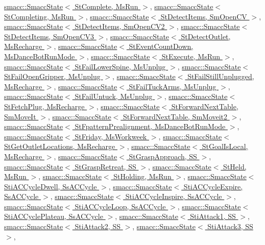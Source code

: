 \hyperlink{classsmacc_1_1SmaccState}{smacc\+::\+Smacc\+State$<$ St\+Complete, Ms\+Run $>$}, \hyperlink{classsmacc_1_1SmaccState}{smacc\+::\+Smacc\+State$<$ St\+Completing, Ms\+Run $>$}, \hyperlink{classsmacc_1_1SmaccState}{smacc\+::\+Smacc\+State$<$ St\+Detect\+Items, Sm\+Open\+C\+V $>$}, \hyperlink{classsmacc_1_1SmaccState}{smacc\+::\+Smacc\+State$<$ St\+Detect\+Items, Sm\+Open\+C\+V2 $>$}, \hyperlink{classsmacc_1_1SmaccState}{smacc\+::\+Smacc\+State$<$ St\+Detect\+Items, Sm\+Open\+C\+V3 $>$}, \hyperlink{classsmacc_1_1SmaccState}{smacc\+::\+Smacc\+State$<$ St\+Detect\+Outlet, Ms\+Recharge $>$}, \hyperlink{classsmacc_1_1SmaccState}{smacc\+::\+Smacc\+State$<$ St\+Event\+Count\+Down, Ms\+Dance\+Bot\+Run\+Mode $>$}, \hyperlink{classsmacc_1_1SmaccState}{smacc\+::\+Smacc\+State$<$ St\+Execute, Ms\+Run $>$}, \hyperlink{classsmacc_1_1SmaccState}{smacc\+::\+Smacc\+State$<$ St\+Fail\+Lower\+Spine, Ms\+Unplug $>$}, \hyperlink{classsmacc_1_1SmaccState}{smacc\+::\+Smacc\+State$<$ St\+Fail\+Open\+Gripper, Ms\+Unplug $>$}, \hyperlink{classsmacc_1_1SmaccState}{smacc\+::\+Smacc\+State$<$ St\+Fail\+Still\+Unplugged, Ms\+Recharge $>$}, \hyperlink{classsmacc_1_1SmaccState}{smacc\+::\+Smacc\+State$<$ St\+Fail\+Tuck\+Arms, Ms\+Unplug $>$}, \hyperlink{classsmacc_1_1SmaccState}{smacc\+::\+Smacc\+State$<$ St\+Fail\+Untuck, Ms\+Unplug $>$}, \hyperlink{classsmacc_1_1SmaccState}{smacc\+::\+Smacc\+State$<$ St\+Fetch\+Plug, Ms\+Recharge $>$}, \hyperlink{classsmacc_1_1SmaccState}{smacc\+::\+Smacc\+State$<$ St\+Forward\+Next\+Table, Sm\+Move\+It $>$}, \hyperlink{classsmacc_1_1SmaccState}{smacc\+::\+Smacc\+State$<$ St\+Forward\+Next\+Table, Sm\+Moveit2 $>$}, \hyperlink{classsmacc_1_1SmaccState}{smacc\+::\+Smacc\+State$<$ St\+Fpattern\+Prealignment, Ms\+Dance\+Bot\+Run\+Mode $>$}, \hyperlink{classsmacc_1_1SmaccState}{smacc\+::\+Smacc\+State$<$ St\+Friday, Ms\+Workweek $>$}, \hyperlink{classsmacc_1_1SmaccState}{smacc\+::\+Smacc\+State$<$ St\+Get\+Outlet\+Locations, Ms\+Recharge $>$}, \hyperlink{classsmacc_1_1SmaccState}{smacc\+::\+Smacc\+State$<$ St\+Goal\+Is\+Local, Ms\+Recharge $>$}, \hyperlink{classsmacc_1_1SmaccState}{smacc\+::\+Smacc\+State$<$ St\+Grasp\+Approach, S\+S $>$}, \hyperlink{classsmacc_1_1SmaccState}{smacc\+::\+Smacc\+State$<$ St\+Grasp\+Retreat, S\+S $>$}, \hyperlink{classsmacc_1_1SmaccState}{smacc\+::\+Smacc\+State$<$ St\+Held, Ms\+Run $>$}, \hyperlink{classsmacc_1_1SmaccState}{smacc\+::\+Smacc\+State$<$ St\+Holding, Ms\+Run $>$}, \hyperlink{classsmacc_1_1SmaccState}{smacc\+::\+Smacc\+State$<$ Sti\+A\+C\+Cycle\+Dwell, Ss\+A\+C\+Cycle $>$}, \hyperlink{classsmacc_1_1SmaccState}{smacc\+::\+Smacc\+State$<$ Sti\+A\+C\+Cycle\+Expire, Ss\+A\+C\+Cycle $>$}, \hyperlink{classsmacc_1_1SmaccState}{smacc\+::\+Smacc\+State$<$ Sti\+A\+C\+Cycle\+Inspire, Ss\+A\+C\+Cycle $>$}, \hyperlink{classsmacc_1_1SmaccState}{smacc\+::\+Smacc\+State$<$ Sti\+A\+C\+Cycle\+Loop, Ss\+A\+C\+Cycle $>$}, \hyperlink{classsmacc_1_1SmaccState}{smacc\+::\+Smacc\+State$<$ Sti\+A\+C\+Cycle\+Plateau, Ss\+A\+C\+Cycle $>$}, \hyperlink{classsmacc_1_1SmaccState}{smacc\+::\+Smacc\+State$<$ Sti\+Attack1, S\+S $>$}, \hyperlink{classsmacc_1_1SmaccState}{smacc\+::\+Smacc\+State$<$ Sti\+Attack2, S\+S $>$}, \hyperlink{classsmacc_1_1SmaccState}{smacc\+::\+Smacc\+State$<$ Sti\+Attack3, S\+S $>$}, 